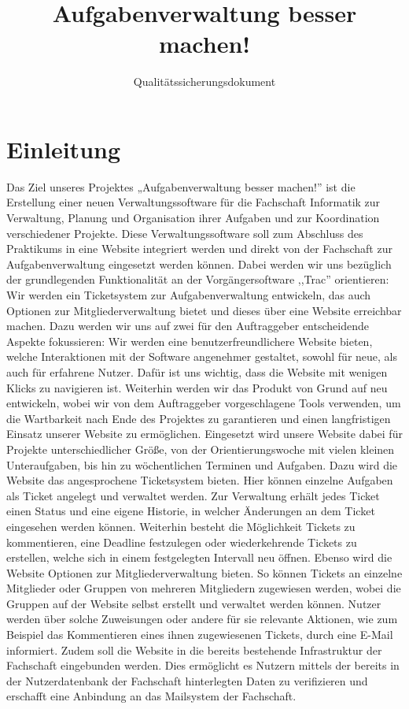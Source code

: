 \documentclass[accentcolor=tud0b,12pt,paper=a4]{tudreport}
\title{Aufgabenverwaltung besser machen!}
\subtitle{Qualitätssicherungsdokument}
\begin{document}
	\maketitle
	\tableofcontents 

	\chapter{Einleitung}
Das Ziel unseres Projektes „Aufgabenverwaltung besser machen!” ist die Erstellung einer neuen Verwaltungssoftware für die Fachschaft Informatik zur Verwaltung, Planung und Organisation ihrer Aufgaben und zur Koordination verschiedener Projekte. 
Diese Verwaltungssoftware soll zum Abschluss des Praktikums in eine Website integriert werden und direkt von der Fachschaft zur Aufgabenverwaltung eingesetzt werden können.
Dabei werden wir uns bezüglich der grundlegenden Funktionalität an der Vorgängersoftware ,,Trac'' orientieren: Wir werden ein Ticketsystem zur Aufgabenverwaltung entwickeln, das auch Optionen zur Mitgliederverwaltung bietet und dieses über eine Website erreichbar machen.
Dazu werden wir uns auf zwei für den Auftraggeber entscheidende Aspekte fokussieren: Wir werden eine benutzerfreundlichere Website bieten, welche Interaktionen mit der Software angenehmer gestaltet, sowohl für neue, als auch für erfahrene Nutzer. Dafür ist uns wichtig, dass die Website mit wenigen Klicks zu navigieren ist. Weiterhin werden wir das Produkt von Grund auf neu entwickeln, wobei wir von dem Auftraggeber vorgeschlagene Tools verwenden, um die Wartbarkeit nach Ende des Projektes zu garantieren und einen langfristigen Einsatz unserer Website zu ermöglichen.
Eingesetzt wird unsere Website dabei für Projekte unterschiedlicher Größe, von der Orientierungswoche mit vielen kleinen Unteraufgaben, bis hin zu wöchentlichen Terminen und Aufgaben.
Dazu wird die Website das angesprochene Ticketsystem bieten. Hier können einzelne Aufgaben als Ticket angelegt und verwaltet werden. Zur Verwaltung erhält jedes Ticket einen Status und eine eigene Historie, in welcher Änderungen an dem Ticket eingesehen werden können. Weiterhin besteht die Möglichkeit Tickets zu kommentieren, eine Deadline festzulegen oder wiederkehrende Tickets zu erstellen, welche sich in einem festgelegten Intervall neu öffnen.
Ebenso wird die Website Optionen zur Mitgliederverwaltung bieten. So können Tickets an einzelne Mitglieder oder Gruppen von mehreren Mitgliedern zugewiesen werden, wobei die Gruppen auf der Website selbst erstellt und verwaltet werden können. Nutzer werden über solche Zuweisungen oder andere für sie relevante Aktionen, wie zum Beispiel das Kommentieren eines ihnen zugewiesenen Tickets, durch eine E-Mail informiert. 
Zudem soll die Website in die bereits bestehende Infrastruktur
der Fachschaft eingebunden werden. Dies ermöglicht es Nutzern mittels der bereits
in der Nutzerdatenbank der Fachschaft hinterlegten Daten zu verifizieren und erschafft eine Anbindung
an das Mailsystem der Fachschaft.\\
\end{document}
